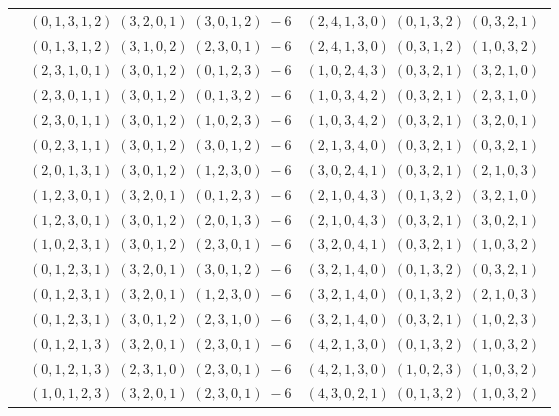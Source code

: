 \documentclass[11pt]{article}
\begin{document}
\begin{longtable}[l]{|c|c|c|}
 \cline{2-3} 
 & $(0 ,1 ,3 ,1 ,2) \;(3 ,2 ,0 ,1) \;(3 ,0 ,1 ,2) \;-6$ & $(2 ,4 ,1 ,3 ,0) \;(0 ,1 ,3 ,2) \;(0 ,3 ,2 ,1) \;$\\ 
 \cline{2-3} 
 & $(0 ,1 ,3 ,1 ,2) \;(3 ,1 ,0 ,2) \;(2 ,3 ,0 ,1) \;-6$ & $(2 ,4 ,1 ,3 ,0) \;(0 ,3 ,1 ,2) \;(1 ,0 ,3 ,2) \;$\\ 
 \cline{2-3} 
 & $(2 ,3 ,1 ,0 ,1) \;(3 ,0 ,1 ,2) \;(0 ,1 ,2 ,3) \;-6$ & $(1 ,0 ,2 ,4 ,3) \;(0 ,3 ,2 ,1) \;(3 ,2 ,1 ,0) \;$\\ 
 \cline{2-3} 
 & $(2 ,3 ,0 ,1 ,1) \;(3 ,0 ,1 ,2) \;(0 ,1 ,3 ,2) \;-6$ & $(1 ,0 ,3 ,4 ,2) \;(0 ,3 ,2 ,1) \;(2 ,3 ,1 ,0) \;$\\ 
 \cline{2-3} 
 & $(2 ,3 ,0 ,1 ,1) \;(3 ,0 ,1 ,2) \;(1 ,0 ,2 ,3) \;-6$ & $(1 ,0 ,3 ,4 ,2) \;(0 ,3 ,2 ,1) \;(3 ,2 ,0 ,1) \;$\\ 
 \cline{2-3} 
 & $(0 ,2 ,3 ,1 ,1) \;(3 ,0 ,1 ,2) \;(3 ,0 ,1 ,2) \;-6$ & $(2 ,1 ,3 ,4 ,0) \;(0 ,3 ,2 ,1) \;(0 ,3 ,2 ,1) \;$\\ 
 \cline{2-3} 
 & $(2 ,0 ,1 ,3 ,1) \;(3 ,0 ,1 ,2) \;(1 ,2 ,3 ,0) \;-6$ & $(3 ,0 ,2 ,4 ,1) \;(0 ,3 ,2 ,1) \;(2 ,1 ,0 ,3) \;$\\ 
 \cline{2-3} 
 & $(1 ,2 ,3 ,0 ,1) \;(3 ,2 ,0 ,1) \;(0 ,1 ,2 ,3) \;-6$ & $(2 ,1 ,0 ,4 ,3) \;(0 ,1 ,3 ,2) \;(3 ,2 ,1 ,0) \;$\\ 
 \cline{2-3} 
 & $(1 ,2 ,3 ,0 ,1) \;(3 ,0 ,1 ,2) \;(2 ,0 ,1 ,3) \;-6$ & $(2 ,1 ,0 ,4 ,3) \;(0 ,3 ,2 ,1) \;(3 ,0 ,2 ,1) \;$\\ 
 \cline{2-3} 
 & $(1 ,0 ,2 ,3 ,1) \;(3 ,0 ,1 ,2) \;(2 ,3 ,0 ,1) \;-6$ & $(3 ,2 ,0 ,4 ,1) \;(0 ,3 ,2 ,1) \;(1 ,0 ,3 ,2) \;$\\ 
 \cline{2-3} 
 & $(0 ,1 ,2 ,3 ,1) \;(3 ,2 ,0 ,1) \;(3 ,0 ,1 ,2) \;-6$ & $(3 ,2 ,1 ,4 ,0) \;(0 ,1 ,3 ,2) \;(0 ,3 ,2 ,1) \;$\\ 
 \cline{2-3} 
 & $(0 ,1 ,2 ,3 ,1) \;(3 ,2 ,0 ,1) \;(1 ,2 ,3 ,0) \;-6$ & $(3 ,2 ,1 ,4 ,0) \;(0 ,1 ,3 ,2) \;(2 ,1 ,0 ,3) \;$\\ 
 \cline{2-3} 
 & $(0 ,1 ,2 ,3 ,1) \;(3 ,0 ,1 ,2) \;(2 ,3 ,1 ,0) \;-6$ & $(3 ,2 ,1 ,4 ,0) \;(0 ,3 ,2 ,1) \;(1 ,0 ,2 ,3) \;$\\ 
 \cline{2-3} 
 & $(0 ,1 ,2 ,1 ,3) \;(3 ,2 ,0 ,1) \;(2 ,3 ,0 ,1) \;-6$ & $(4 ,2 ,1 ,3 ,0) \;(0 ,1 ,3 ,2) \;(1 ,0 ,3 ,2) \;$\\ 
 \cline{2-3} 
 & $(0 ,1 ,2 ,1 ,3) \;(2 ,3 ,1 ,0) \;(2 ,3 ,0 ,1) \;-6$ & $(4 ,2 ,1 ,3 ,0) \;(1 ,0 ,2 ,3) \;(1 ,0 ,3 ,2) \;$\\ 
 \cline{2-3} 
 & $(1 ,0 ,1 ,2 ,3) \;(3 ,2 ,0 ,1) \;(2 ,3 ,0 ,1) \;-6$ & $(4 ,3 ,0 ,2 ,1) \;(0 ,1 ,3 ,2) \;(1 ,0 ,3 ,2) \;$\\ 

\end{longtable}
\end{document}
